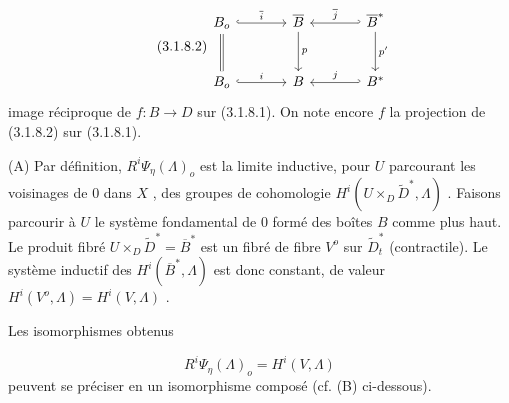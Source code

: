 \begin{equation}\tag{3.1.8.2}
\begin{tikzcd}[column sep=large, row sep=large]
B_o \arrow[r, hook, "\overline{i}"] \arrow[d, equal] & \overline{B} \arrow[d, "p"] & \overline{B}^* \arrow[l, hook', "\overline{j}"'] \arrow[d, "p'"] \\
B_o \arrow[r, hook, "i"] & B & B^* \arrow[l, hook', "j"']
\end{tikzcd}
\end{equation}
image réciproque de $f : B \longrightarrow D$ sur (3.1.8.1). On note encore $f$ la projection de (3.1.8.2) sur (3.1.8.1).

(A) Par définition, $R^i\Psi_\eta(\Lambda)_o$ est la limite inductive, pour $U$ parcourant les voisinages de $0$ dans $X$ , des groupes de cohomologie $H^i(U \times_D \widetilde{D}^*, \Lambda)$ . Faisons parcourir à $U$ le système fondamental de $0$ formé des boîtes $B$ comme plus haut. Le produit fibré $U \times_D \widetilde{D}^* = \overline{B}^*$ est un fibré de fibre $V^o$ sur $\widetilde{D}^*_t$ (contractile). Le système inductif des $H^i(\overline{B}^*, \Lambda)$ est donc constant, de valeur $H^i(V^o, \Lambda)=H^i(V, \Lambda)$ .



Les isomorphismes obtenus

\begin{equation}\tag{3.1.8.3}
R^i\Psi_\eta(\Lambda)_o = H^i(V, \Lambda)
\end{equation}
peuvent se préciser en un isomorphisme composé (cf. (B) ci-dessous).

